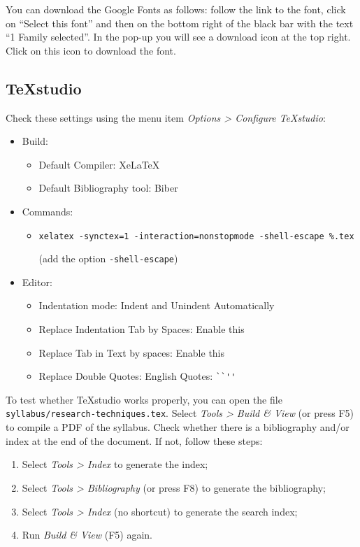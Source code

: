 You can download the Google Fonts as follows: follow the link to the font, click on ``Select this font'' and then on the bottom right of the black bar with the text ``1 Family selected''. In the pop-up you will see a download icon at the top right. Click on this icon to download the font.

\subsection{TeXstudio}

Check these settings using the menu item \emph{Options > Configure TeXstudio}:

\begin{itemize}
    \item Build:
    \begin{itemize}
        \item Default Compiler: XeLaTeX
        \item Default Bibliography tool: Biber
    \end{itemize}
    \item Commands:
    \begin{itemize}
        \item \texttt{xelatex -synctex=1 -interaction=nonstopmode  -shell-escape \%.tex}
        
        (add the option \texttt{-shell-escape})
    \end{itemize}
    \item Editor:
    \begin{itemize}
        \item Indentation mode: Indent and Unindent Automatically
        \item Replace Indentation Tab by Spaces: Enable this
        \item Replace Tab in Text by spaces: Enable this
        \item Replace Double Quotes: English Quotes: \verb|``''|
    \end{itemize}
    
\end{itemize}

To test whether TeXstudio works properly, you can open the file \texttt{syllabus/research-techniques.tex}. Select \emph{Tools > Build \& View} (or press F5) to compile a PDF of the syllabus. Check whether there is a bibliography and/or index at the end of the document. If not, follow these steps:

\begin{enumerate}
    \item Select \emph{Tools > Index} to generate the index;
    \item Select \emph{Tools > Bibliography} (or press F8) to generate the bibliography;
    \item Select \emph{Tools > Index} (no shortcut) to generate the search index;
    \item Run \emph{Build \& View} (F5) again.
\end{enumerate}

